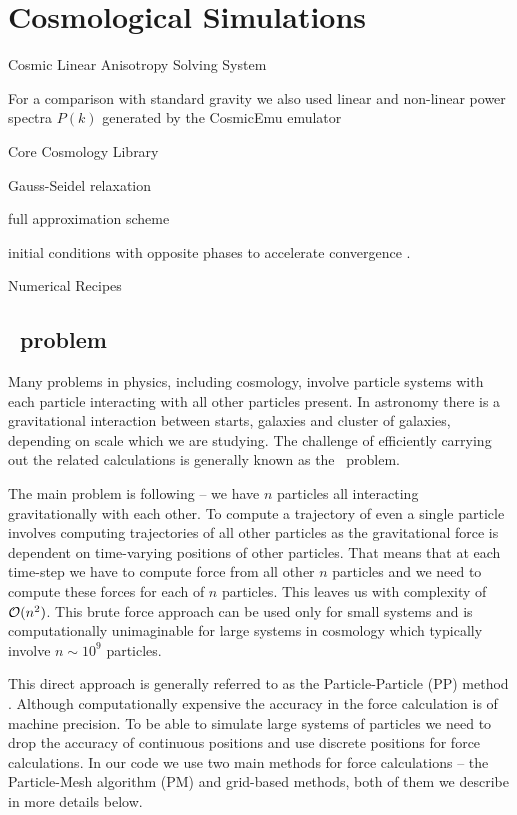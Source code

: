 \chapter{Cosmological Simulations}
Cosmic Linear Anisotropy Solving System \parencite[CLASS,][]{class}

For a comparison with standard gravity we also used linear and non-linear power spectra $P(k)$ generated by the CosmicEmu emulator \parencite{Heitmann:2015xma}

Core Cosmology Library \parencite{2018arXiv181205995C}

Gauss-Seidel relaxation \parencite{doi:10.1002/zamm.19720520813}

full approximation scheme \parencite[FAS, see, e.g.,][]{MG_overview}

initial conditions with opposite phases to accelerate convergence \parencite{PhysRevD.93.103519}.

Numerical Recipes \parencite{10.5555/42249}


\section{\nbody\ problem}
Many problems in physics, including cosmology, involve particle systems with each particle interacting with all other particles present. In astronomy there is a gravitational interaction between starts, galaxies and cluster of galaxies, depending on scale which we are studying. The challenge of efficiently carrying out the related calculations is generally known as the \nbody\ problem.

The main problem is following -- we have $n$ particles all interacting gravitationally with each other. To compute a trajectory of even a single particle involves computing trajectories of all other particles as the gravitational force is dependent on time-varying positions of other particles. That means that at each time-step we have to compute force from all other $n$ particles and we need to compute these forces for each of $n$ particles. This leaves us with complexity of \(\mathcal{O}(n^2)\). This brute force approach can be used only for small systems and is computationally unimaginable for large systems in cosmology which typically involve \(n\sim10^{9}\) particles.

This direct approach is generally referred to as the Particle-Particle (PP) method \parencite{Hockney:1988:CSU:62815}. Although computationally expensive the accuracy in the force calculation is of machine precision. To be able to simulate large systems of particles we need to drop the accuracy of continuous positions and use discrete positions for force calculations. In our code we use two main methods for force calculations -- the Particle-Mesh algorithm (PM) and grid-based methods, both of them we describe in more details below.
